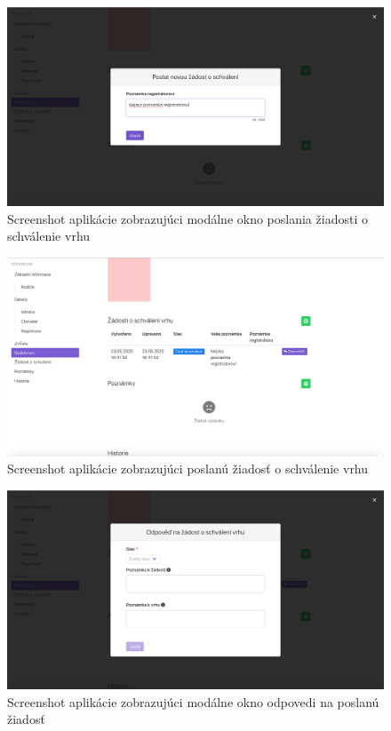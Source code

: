 \begin{figure}[H]
	\includegraphics[width=1.0\textwidth]{media/priloha/vrh/ziadost/1.png}
	\caption{Screenshot aplikácie zobrazujúci modálne okno poslania žiadosti o schválenie vrhu}
\end{figure}

\begin{figure}[H]
	\includegraphics[width=1.0\textwidth]{media/priloha/vrh/ziadost/2.png}
	\caption{Screenshot aplikácie zobrazujúci poslanú žiadosť o schválenie vrhu}
\end{figure}

\begin{figure}[H]
	\includegraphics[width=1.0\textwidth]{media/priloha/vrh/ziadost/3.png}
	\caption{Screenshot aplikácie zobrazujúci modálne okno odpovedi na poslanú žiadosť}
\end{figure}

